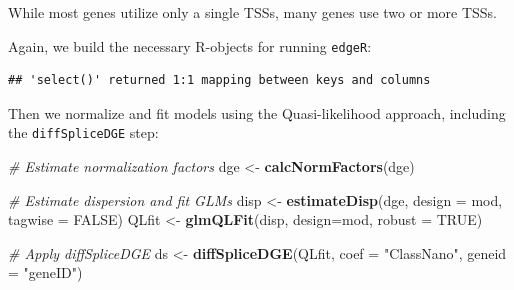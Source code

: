 \documentclass[9pt,a4paper,]{extarticle}
\newenvironment{Shaded}{\begin{snugshade}}{\end{snugshade}}
\newcommand{\KeywordTok}[1]{\textcolor[rgb]{0.13,0.29,0.53}{\textbf{{#1}}}}
\newcommand{\DataTypeTok}[1]{\textcolor[rgb]{0.13,0.29,0.53}{{#1}}}
\newcommand{\StringTok}[1]{\textcolor[rgb]{0.31,0.60,0.02}{{#1}}}
\newcommand{\CommentTok}[1]{\textcolor[rgb]{0.56,0.35,0.01}{\textit{{#1}}}}
\newcommand{\OtherTok}[1]{\textcolor[rgb]{0.56,0.35,0.01}{{#1}}}
\newcommand{\NormalTok}[1]{{#1}}
\begin{document}
While most genes utilize only a single TSSs, many genes use two or more TSSs.

Again, we build the necessary R-objects for running \texttt{edgeR}:

\begin{Shaded}
\end{Shaded}

\begin{verbatim}
## 'select()' returned 1:1 mapping between keys and columns
\end{verbatim}

\begin{Shaded}
\end{Shaded}

Then we normalize and fit models using the Quasi-likelihood approach, including the \texttt{diffSpliceDGE} step:

\begin{Shaded}
\begin{Highlighting}[]
\CommentTok{# Estimate normalization factors}
\NormalTok{dge <-}\StringTok{ }\KeywordTok{calcNormFactors}\NormalTok{(dge)}

\CommentTok{# Estimate dispersion and fit GLMs}
\NormalTok{disp <-}\StringTok{ }\KeywordTok{estimateDisp}\NormalTok{(dge, }\DataTypeTok{design =} \NormalTok{mod, }\DataTypeTok{tagwise =} \OtherTok{FALSE}\NormalTok{)}
\NormalTok{QLfit <-}\StringTok{ }\KeywordTok{glmQLFit}\NormalTok{(disp, }\DataTypeTok{design=}\NormalTok{mod, }\DataTypeTok{robust =} \OtherTok{TRUE}\NormalTok{)}

\CommentTok{# Apply diffSpliceDGE}
\NormalTok{ds <-}\StringTok{ }\KeywordTok{diffSpliceDGE}\NormalTok{(QLfit, }\DataTypeTok{coef =} \StringTok{"ClassNano"}\NormalTok{, }\DataTypeTok{geneid =} \StringTok{"geneID"}\NormalTok{)}
\end{Highlighting}
\end{Shaded}
\end{document}
